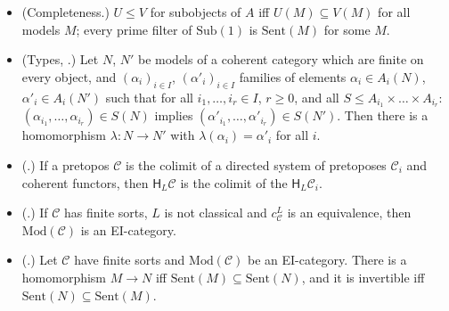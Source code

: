 \documentclass[11pt]{amsart}
\theoremstyle{definition}
\newcommand{\Sub}{\mathrm{Sub}}
\newcommand{\Mod}{\mathrm{Mod}}
\newcommand{\Sent}{\mathrm{Sent}}
\newcommand{\HH}{\mathsf H}
\newcommand{\cC}{\mathcal C}
\begin{document}
\begin{itemize}
\item[(R1)] (Completeness.) $U\le V$ for subobjects of $A$ iff
$U(M)\subseteq V(M)$ for all models $M$; every prime filter of
$\Sub(1)$ is $\Sent(M)$ for some $M$.
\item[(R2)] (Types, \cite[Lemma~4.3]{Finsorts}.) Let $N$, $N'$ be
models of a coherent category which are finite on every object, and
$(\alpha_i)_{i\in I}$, $(\alpha'_i)_{i\in I}$ families of elements
$\alpha_i\in A_i(N)$, $\alpha'_i\in A_i(N')$ such that for all
$i_1,\dots,i_r\in I$, $r\ge0$, and all $S\le A_{i_1}\times\dots\times
A_{i_r}$: $(\alpha_{i_1},\dots,\alpha_{i_r})\in S(N)$ implies
$(\alpha'_{i_1},\dots,\alpha'_{i_r})\in S(N')$. Then there is a
homomorphism $\lambda\colon N\to N'$ with $\lambda(\alpha_i)=
\alpha'_i$ for all $i$.
\item[(R3)] (\cite[Lemma~5.3 and its proof]{Finsorts}.) If a pretopos
$\cC$ is the colimit of a directed system of pretoposes $\cC_i$ and
coherent functors, then $\HH_L\cC$ is the colimit of the $\HH_L\cC_i$.
\item[(R4)] (\cite[Remark after Thm.~5.5]{Finsorts}.) If $\cC$ has
finite sorts, $L$ is not classical and $c^L_\cC$ is an equivalence,
then $\Mod(\cC)$ is an EI-category.
\item[(R5)] (\cite[Prop.~3.1]{Proftrees}.) Let $\cC$ have finite sorts
and $\Mod(\cC)$ be an EI-category. There is a homomorphism $M\to N$
iff $\Sent(M)\subseteq\Sent(N)$, and it is invertible iff
$\Sent(N)\subseteq\Sent(M)$.
\end{itemize}
\end{document}
